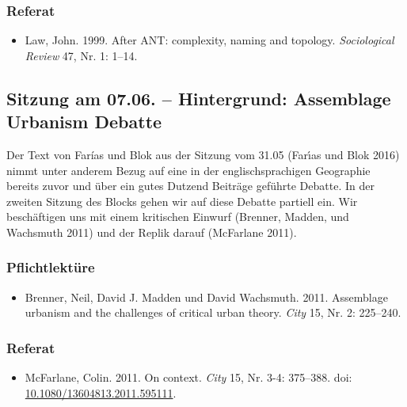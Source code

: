 \documentclass[
  ngerman,
]{article}
\providecommand{\tightlist}{%
  \setlength{\itemsep}{0pt}\setlength{\parskip}{0pt}}
\begin{document}
\hypertarget{referat-5}{%
\subsubsection*{Referat}\label{referat-5}}

\begin{itemize}
\tightlist
\item
  Law, John. 1999. After ANT: complexity, naming and topology. \emph{Sociological Review} 47, Nr. 1: 1--14.
\end{itemize}

\hypertarget{sitzung-am-07.06.-hintergrund-assemblage-urbanism-debatte}{%
\subsection{Sitzung am 07.06. -- Hintergrund: Assemblage Urbanism Debatte}\label{sitzung-am-07.06.-hintergrund-assemblage-urbanism-debatte}}

Der Text von Farías und Blok aus der Sitzung vom 31.05 (Farı́as und Blok 2016) nimmt unter anderem Bezug auf eine in der englischsprachigen Geographie bereits zuvor und über ein gutes Dutzend Beiträge geführte Debatte. In der zweiten Sitzung des Blocks gehen wir auf diese Debatte partiell ein. Wir beschäftigen uns mit einem kritischen Einwurf (Brenner, Madden, und Wachsmuth 2011) und der Replik darauf (McFarlane 2011).

\hypertarget{pflichtlektuxfcre-6}{%
\subsubsection*{Pflichtlektüre}\label{pflichtlektuxfcre-6}}

\begin{itemize}
\tightlist
\item
  Brenner, Neil, David J. Madden und David Wachsmuth. 2011. Assemblage urbanism and the challenges of critical urban theory. \emph{City} 15, Nr. 2: 225--240.
\end{itemize}

\hypertarget{referat-6}{%
\subsubsection*{Referat}\label{referat-6}}

\begin{itemize}
\tightlist
\item
  McFarlane, Colin. 2011. On context. \emph{City} 15, Nr. 3-4: 375--388. doi: \href{https://doi.org/10.1080/13604813.2011.595111}{10.1080/13604813.2011.595111}.
\end{itemize}
\end{document}
